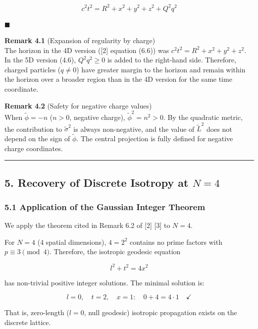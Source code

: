 \documentclass[a4paper,11pt]{article}
\theoremstyle{definition}
\begin{document}
\[c^2t^2 = R^2 + x^2 + y^2 + z^2 + Q^2q^2 \tag{4.6}\]

\(\blacksquare\)

\textbf{Remark 4.1} (Expansion of regularity by charge)\\
The horizon in the 4D version ({[}2{]} equation (6.6)) was \(c^2t^2 = R^2 + x^2 + y^2 + z^2\). In the 5D version (4.6), \(Q^2q^2 \geq 0\) is added to the right-hand side. Therefore, charged particles (\(q \neq 0\)) have greater margin to the horizon and remain within the horizon over a broader region than in the 4D version for the same time coordinate.

\textbf{Remark 4.2} (Safety for negative charge values)\\
When \(\tilde{\phi} = -n\) (\(n > 0\), negative charge), \(\tilde{\phi}^2 = n^2 > 0\). By the quadratic metric, the contribution to \(\tilde{\sigma}^2\) is always non-negative, and the value of \(\tilde{L}^2\) does not depend on the sign of \(\tilde{\phi}\). The central projection is fully defined for negative charge coordinates.

\begin{center}\rule{0.5\linewidth}{0.5pt}\end{center}

\subsection{\texorpdfstring{5. Recovery of Discrete Isotropy at \(N = 4\)}{5. Recovery of Discrete Isotropy at N = 4}}\label{recovery-of-discrete-isotropy-at-n-4}

\subsubsection{5.1 Application of the Gaussian Integer Theorem}\label{application-of-the-gaussian-integer-theorem}

We apply the theorem cited in Remark 6.2 of {[}2{]} {[}3{]} to \(N = 4\).

For \(N = 4\) (4 spatial dimensions), \(4 = 2^2\) contains no prime factors with \(p \equiv 3 \pmod{4}\). Therefore, the isotropic geodesic equation

\[l^2 + t^2 = 4x^2 \tag{5.1}\]

has non-trivial positive integer solutions. The minimal solution is:

\[l = 0, \quad t = 2, \quad x = 1: \quad 0 + 4 = 4 \cdot 1 \quad \checkmark \tag{5.2}\]

That is, zero-length (\(l = 0\), null geodesic) isotropic propagation exists on the discrete lattice.
\end{document}
